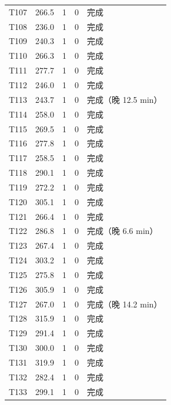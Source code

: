 \documentclass[a4paper,11pt]{article}
\begin{document}
\begin{table}[htbp]
\begin{tabular}{rcccl}
T107 & 266.5 & 1 & 0 & 完成 \\
T108 & 236.0 & 1 & 0 & 完成 \\
T109 & 240.3 & 1 & 0 & 完成 \\
T110 & 266.3 & 1 & 0 & 完成 \\
T111 & 277.7 & 1 & 0 & 完成 \\
T112 & 246.0 & 1 & 0 & 完成 \\
T113 & 243.7 & 1 & 0 & 完成（晚 12.5 min） \\
T114 & 258.0 & 1 & 0 & 完成 \\
T115 & 269.5 & 1 & 0 & 完成 \\
T116 & 277.8 & 1 & 0 & 完成 \\
T117 & 258.5 & 1 & 0 & 完成 \\
T118 & 290.1 & 1 & 0 & 完成 \\
T119 & 272.2 & 1 & 0 & 完成 \\
T120 & 305.1 & 1 & 0 & 完成 \\
T121 & 266.4 & 1 & 0 & 完成 \\
T122 & 286.8 & 1 & 0 & 完成（晚 6.6 min） \\
T123 & 267.4 & 1 & 0 & 完成 \\
T124 & 303.2 & 1 & 0 & 完成 \\
T125 & 275.8 & 1 & 0 & 完成 \\
T126 & 305.9 & 1 & 0 & 完成 \\
T127 & 267.0 & 1 & 0 & 完成（晚 14.2 min） \\
T128 & 315.9 & 1 & 0 & 完成 \\
T129 & 291.4 & 1 & 0 & 完成 \\
T130 & 300.0 & 1 & 0 & 完成 \\
T131 & 319.9 & 1 & 0 & 完成 \\
T132 & 282.4 & 1 & 0 & 完成 \\
T133 & 299.1 & 1 & 0 & 完成 \\
\bottomrule
\end{tabular}
\end{table}
\end{document}
